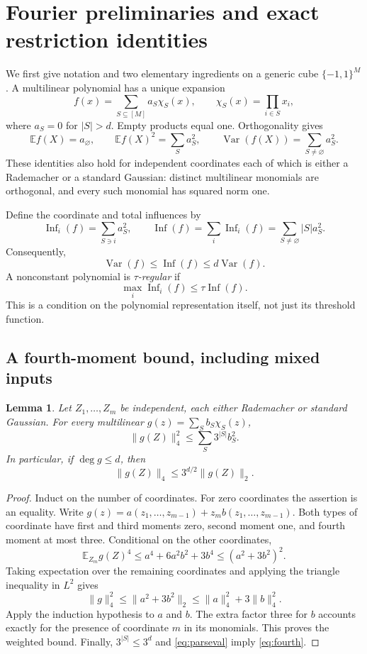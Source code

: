 \documentclass[11pt]{article}
\newcommand{\E}{\mathbb E}
\newcommand{\Var}{\operatorname{Var}}
\newcommand{\Inf}{\operatorname{Inf}}
\newcommand{\1}{\mathbf 1}
\newtheorem{lemma}[theorem]{Lemma}
\theoremstyle{definition}
\theoremstyle{remark}
\numberwithin{equation}{section}
\begin{document}
\section{Fourier preliminaries and exact restriction identities}

We first give notation and two elementary ingredients on a generic cube $\{-1,1\}^M$. A multilinear polynomial has a unique expansion
\[
 f(x)=\sum_{S\subseteq[M]}a_S\chi_S(x),\qquad
 \chi_S(x)=\prod_{i\in S}x_i,
\]
where $a_S=0$ for $|S|>d$. Empty products equal one. Orthogonality gives
\begin{equation}\label{eq:parseval}
 \E f(X)=a_\varnothing,\qquad
 \E f(X)^2=\sum_Sa_S^2,\qquad
 \Var(f(X))=\sum_{S\ne\varnothing}a_S^2.
\end{equation}
These identities also hold for independent coordinates each of which is either a Rademacher or a standard Gaussian: distinct multilinear monomials are orthogonal, and every such monomial has squared norm one.

Define the coordinate and total influences by
\[
 \Inf_i(f)=\sum_{S\ni i}a_S^2,\qquad
 \Inf(f)=\sum_i\Inf_i(f)=\sum_{S\ne\varnothing}|S|a_S^2.
\]
Consequently,
\begin{equation}\label{eq:total-inf}
 \Var(f)\le\Inf(f)\le d\Var(f).
\end{equation}
A nonconstant polynomial is \emph{$\tau$-regular} if
\[
 \max_i\Inf_i(f)\le\tau\Inf(f).
\]
This is a condition on the polynomial representation itself, not just its threshold function.

\subsection{A fourth-moment bound, including mixed inputs}

\begin{lemma}\label{lem:fourth}
Let $Z_1,\ldots,Z_m$ be independent, each either Rademacher or standard Gaussian. For every multilinear $g(z)=\sum_Sb_S\chi_S(z)$,
\[
 \|g(Z)\|_4^2\le\sum_S3^{|S|}b_S^2.
\]
In particular, if $\deg g\le d$, then
\begin{equation}\label{eq:fourth}
 \|g(Z)\|_4\le3^{d/2}\|g(Z)\|_2.
\end{equation}
\end{lemma}
\begin{proof}
Induct on the number of coordinates. For zero coordinates the assertion is an equality. Write $g(z)=a(z_1,\ldots,z_{m-1})+z_m b(z_1,\ldots,z_{m-1})$. Both types of coordinate have first and third moments zero, second moment one, and fourth moment at most three. Conditional on the other coordinates,
\[
 \E_{Z_m}g(Z)^4
 \le a^4+6a^2b^2+3b^4
 \le(a^2+3b^2)^2.
\]
Taking expectation over the remaining coordinates and applying the triangle inequality in $L^2$ gives
\[
 \|g\|_4^2\le\|a^2+3b^2\|_2
 \le\|a\|_4^2+3\|b\|_4^2.
\]
Apply the induction hypothesis to $a$ and $b$. The extra factor three for $b$ accounts exactly for the presence of coordinate $m$ in its monomials. This proves the weighted bound. Finally, $3^{|S|}\le3^d$ and \eqref{eq:parseval} imply \eqref{eq:fourth}.
\end{proof}
\end{document}
